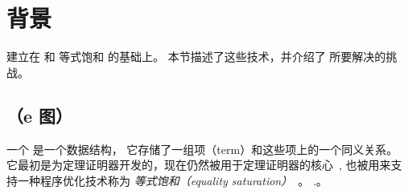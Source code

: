\section{背景}
\label{sec:background}


\egg 建立在 \egraphs 和 等式饱和 的基础上。
  本节描述了这些技术，并介绍了 \egg 所要解决的挑战。



\subsection{\Egraphs （e 图）}
\label{sec:egraphs}

一个 \textit{\egraph} 是一个数据结构，
  它存储了一组项（term）和这些项上的一个同义关系。%
它最初是为定理证明器开发的，现在仍然被用于定理证明器的核心~\cite{nelson, simplify, z3},
  \egraphs 也被用来支持一种程序优化技术称为 \textit{等式饱和（equality saturation）}~。
  \cite{denali, eqsat, eqsat-llvm, szalinski, yogo-pldi20, spores, herbie}.。
  
